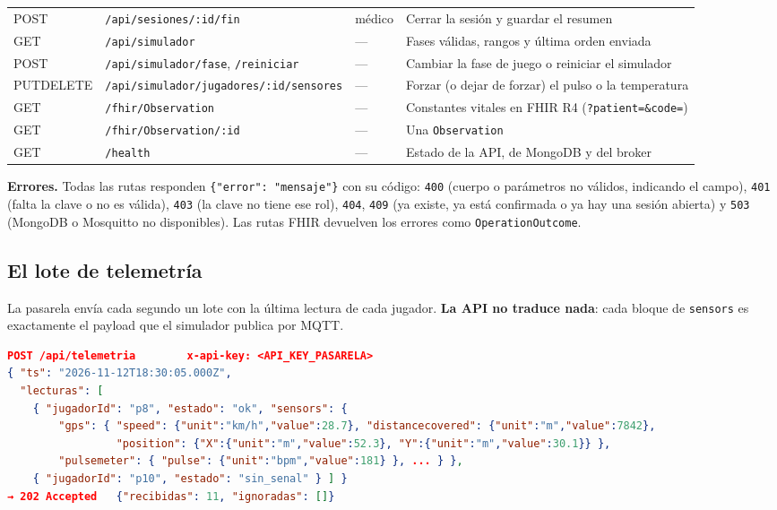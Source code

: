 \documentclass[runningheads]{llncs}
\newcommand{\ruta}[1]{\texttt{#1}}
\begin{document}
\begin{table}[!htbp]
\begin{tabularx}{\textwidth}{>{\raggedright\arraybackslash}p{1.1cm}>{\raggedright\arraybackslash}p{4.6cm}>{\raggedright\arraybackslash}p{1.15cm}L}
POST & \ruta{/api/sesiones/:id/fin} & médico & Cerrar la sesión y guardar el resumen \\
GET & \ruta{/api/simulador} & — & Fases válidas, rangos y última orden enviada \\
POST & \ruta{/api/simulador/fase}, \ruta{/reiniciar} & — & Cambiar la fase de juego o reiniciar el simulador \\
PUT\newline DELETE & \ruta{/api/simulador/jugadores/:id/sensores} & — & Forzar (o dejar de forzar) el pulso o la temperatura \\
GET & \ruta{/fhir/Observation} & — & Constantes vitales en FHIR R4 (\texttt{?patient=\&code=}) \\
GET & \ruta{/fhir/Observation/:id} & — & Una \texttt{Observation} \\
GET & \ruta{/health} & — & Estado de la API, de MongoDB y del broker \\
\bottomrule
\end{tabularx}
\end{table}

\textbf{Errores.} Todas las rutas responden \texttt{\{"error": "mensaje"\}} con su código: \texttt{400} (cuerpo o parámetros no válidos, indicando el campo), \texttt{401} (falta la clave o no es válida), \texttt{403} (la clave no tiene ese rol), \texttt{404}, \texttt{409} (ya existe, ya está confirmada o ya hay una sesión abierta) y \texttt{503} (MongoDB o Mosquitto no disponibles). Las rutas FHIR devuelven los errores como \texttt{OperationOutcome}.

\subsection{El lote de telemetría}

La pasarela envía cada segundo un lote con la última lectura de cada jugador. \textbf{La API no traduce nada}: cada bloque de \texttt{sensors} es exactamente el payload que el simulador publica por MQTT.

\begin{lstlisting}[language=json]
POST /api/telemetria        x-api-key: <API_KEY_PASARELA>
{ "ts": "2026-11-12T18:30:05.000Z",
  "lecturas": [
    { "jugadorId": "p8", "estado": "ok", "sensors": {
        "gps": { "speed": {"unit":"km/h","value":28.7}, "distancecovered": {"unit":"m","value":7842},
                 "position": {"X":{"unit":"m","value":52.3}, "Y":{"unit":"m","value":30.1}} },
        "pulsemeter": { "pulse": {"unit":"bpm","value":181} }, ... } },
    { "jugadorId": "p10", "estado": "sin_senal" } ] }
→ 202 Accepted   {"recibidas": 11, "ignoradas": []}
\end{lstlisting}
\end{document}
